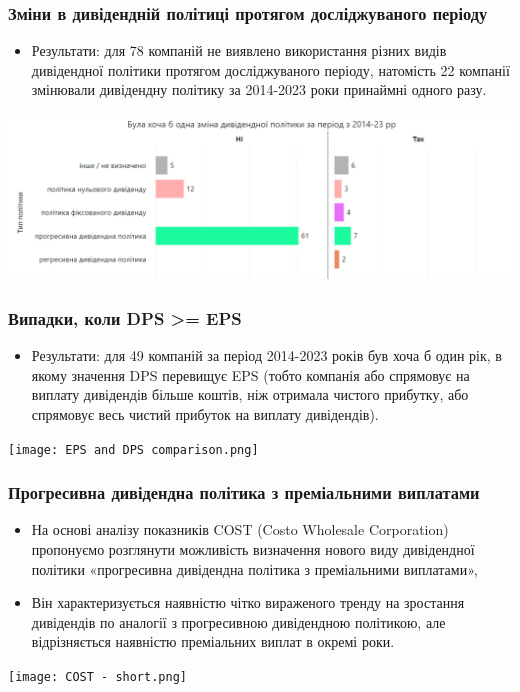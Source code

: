 \documentclass[aspectratio=169]{beamer}
\begin{document}
\begin{frame}
\frametitle{Зміни в дивідендній політиці протягом досліджуваного періоду}
\begin{center}
\begin{itemize}
\item  \alert {Результати:} для 78 компаній не виявлено використання різних видів дивідендної політики протягом досліджуваного періоду, натомість 22 компанії змінювали дивідендну політику за 2014-2023 роки принаймні одного разу.
\end{itemize} 
\bigskip
\includegraphics[scale=0.35]{Dividend policy Changes.png}
\end{center}
\end{frame}

\begin{frame}
\frametitle{Випадки, коли DPS >= EPS }
\begin{center}
\begin{itemize}
\item  \alert {Результати:} для 49 компаній за період 2014-2023 років був хоча б один рік, в якому значення DPS перевищує EPS (тобто компанія або спрямовує на виплату дивідендів більше коштів, ніж отримала чистого прибутку, або спрямовує весь чистий прибуток на виплату дивідендів).
\end{itemize}
\bigskip
\texttt{[image: EPS and DPS comparison.png]}
\end{center}
\end{frame}

\begin{frame}
\frametitle{Прогресивна дивідендна політика з преміальними виплатами}
\begin{multicols}{2}
\begin{itemize}
\item На основі аналізу показників COST (Costo Wholesale Corporation) пропонуємо розглянути можливість визначення нового виду дивідендної політики \alert {«прогресивна дивідендна політика з преміальними виплатами»},
\bigskip
\item Він \alert {характеризується} наявністю чітко вираженого тренду на зростання дивідендів по аналогії з прогресивною дивідендною політикою, але відрізняється наявністю преміальних виплат в окремі роки.
\end{itemize}
\columnbreak
\hspace{5mm}
\texttt{[image: COST - short.png]}
\end{multicols}
\end{frame}
\end{document}

